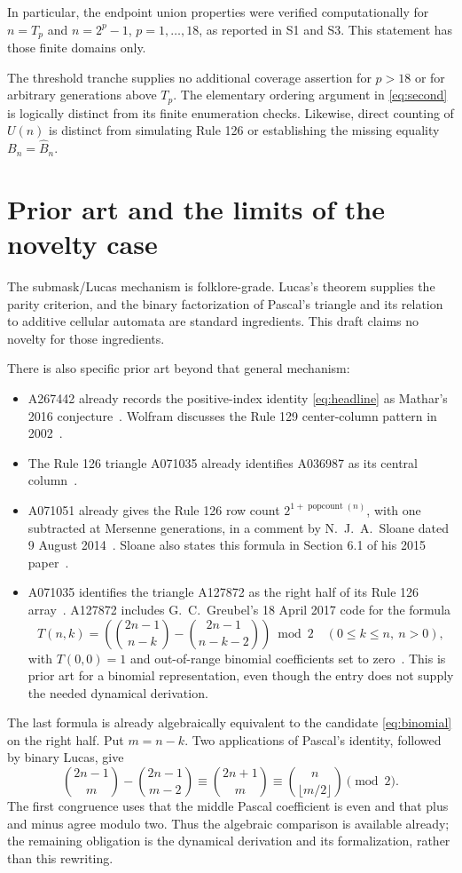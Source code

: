 \documentclass[11pt]{article}
\newcommand{\pc}{\operatorname{popcount}}
\begin{document}
In particular, the endpoint union properties were verified computationally
for $n=T_p$ and $n=2^p-1$, $p=1,\ldots,18$, as reported in S1 and S3.
This statement has those finite domains only.

The threshold tranche supplies no additional coverage assertion for
$p>18$ or for arbitrary generations above $T_p$. The elementary ordering
argument in \eqref{eq:second} is logically distinct from its finite
enumeration checks. Likewise, direct counting of $U(n)$ is distinct from
simulating Rule 126 or establishing the missing equality
$B_n=\widehat B_n$.

\section{Prior art and the limits of the novelty case}
\label{sec:prior}

The submask/Lucas mechanism is folklore-grade. Lucas's theorem supplies the
parity criterion, and the binary factorization of Pascal's triangle and
its relation to additive cellular automata are standard ingredients. This
draft claims no novelty for those ingredients.

There is also specific prior art beyond that general mechanism:
\begin{itemize}
\item A267442 already records the positive-index identity
\eqref{eq:headline} as Mathar's 2016 conjecture~\cite{oeis267442}.
Wolfram discusses the Rule 129 center-column pattern in 2002~\cite{wolfram129}.
\item The Rule 126 triangle A071035 already identifies A036987 as its
central column~\cite{oeis071035}.
\item A071051 already gives the Rule 126 row count
$2^{1+\pc(n)}$, with one subtracted at Mersenne generations, in a comment
by N.\ J.\ A.\ Sloane dated 9 August 2014~\cite{oeis071051}. Sloane also
states this formula in Section 6.1 of his 2015 paper~\cite{sloane}.
\item A071035 identifies the triangle A127872 as the right half of its
Rule 126 array~\cite{oeis071035}. A127872 includes G.\ C.\ Greubel's
18 April 2017 code for the formula
\[
 T(n,k)=\left(\binom{2n-1}{n-k}-\binom{2n-1}{n-k-2}\right)\bmod2
 \quad(0\leq k\leq n,\ n>0),
\]
with $T(0,0)=1$ and out-of-range binomial coefficients set to
zero~\cite{oeis127872}. This is prior art for a binomial representation,
even though the entry does not supply the needed dynamical derivation.
\end{itemize}
The last formula is already algebraically equivalent to the candidate
\eqref{eq:binomial} on the right half. Put $m=n-k$. Two applications of
Pascal's identity, followed by binary Lucas, give
\begin{equation}
 \binom{2n-1}{m}-\binom{2n-1}{m-2}
 \equiv\binom{2n+1}{m}
 \equiv\binom{n}{\lfloor m/2\rfloor}\pmod2.
 \label{eq:prior-equivalence}
\end{equation}
The first congruence uses that the middle Pascal coefficient is even and
that plus and minus agree modulo two. Thus the algebraic comparison is
available already; the remaining obligation is the dynamical derivation
and its formalization, rather than this rewriting.
\end{document}
